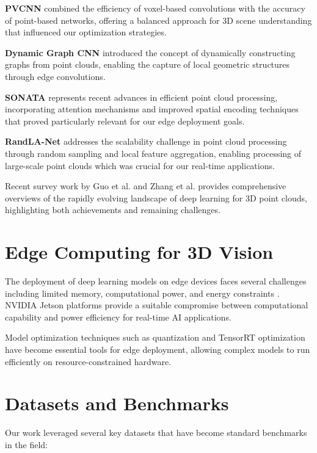 \documentclass[12pt,a4paper]{report}
\begin{document}
\textbf{PVCNN} \cite{liu2019point} combined the efficiency of voxel-based convolutions with the accuracy of point-based networks, offering a balanced approach for 3D scene understanding that influenced our optimization strategies.

\textbf{Dynamic Graph CNN} \cite{wang2019dynamic} introduced the concept of dynamically constructing graphs from point clouds, enabling the capture of local geometric structures through edge convolutions.

\textbf{SONATA} \cite{facebook2023sonata} represents recent advances in efficient point cloud processing, incorporating attention mechanisms and improved spatial encoding techniques that proved particularly relevant for our edge deployment goals.

\textbf{RandLA-Net} \cite{hu2020randla} addresses the scalability challenge in point cloud processing through random sampling and local feature aggregation, enabling processing of large-scale point clouds which was crucial for our real-time applications.

Recent survey work by Guo et al. \cite{guo2020deep} and Zhang et al. \cite{zhang2021review} provides comprehensive overviews of the rapidly evolving landscape of deep learning for 3D point clouds, highlighting both achievements and remaining challenges.

\section{Edge Computing for 3D Vision}

The deployment of deep learning models on edge devices faces several challenges including limited memory, computational power, and energy constraints \cite{howard2017mobilenets}. NVIDIA Jetson platforms provide a suitable compromise between computational capability and power efficiency for real-time AI applications.

Model optimization techniques such as quantization \cite{jacob2018quantization} and TensorRT optimization \cite{nvidia2019tensorrt} have become essential tools for edge deployment, allowing complex models to run efficiently on resource-constrained hardware.

\section{Datasets and Benchmarks}

Our work leveraged several key datasets that have become standard benchmarks in the field:
\end{document}
